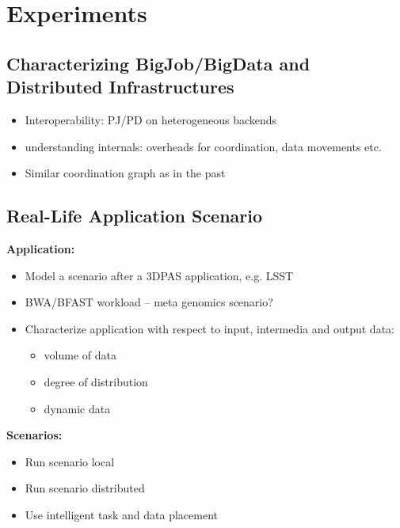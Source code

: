\documentclass{sig-alternate}
\begin{document}
\section{Experiments}


\subsection{Characterizing BigJob/BigData and Distributed Infrastructures}
\begin{itemize}
	\item Interoperability: PJ/PD on heterogeneous backends
    \item understanding internals: overheads for coordination, data movements etc.
	\item Similar coordination graph as in the past
\end{itemize}




\subsection{Real-Life Application Scenario}

\textbf{Application:}
\begin{itemize}
	\item Model a scenario after a 3DPAS application, e.g. LSST
    \item BWA/BFAST workload -- meta genomics scenario?
	\item Characterize application with respect to input, intermedia and 
	output data:
		\begin{itemize}
			\item volume of data
			\item degree of distribution
			\item dynamic data
		\end{itemize}
\end{itemize}

\textbf{Scenarios:}
\begin{itemize}
	\item Run scenario local
	\item Run scenario distributed
	\item Use intelligent task and data placement
\end{itemize}
\end{document}
